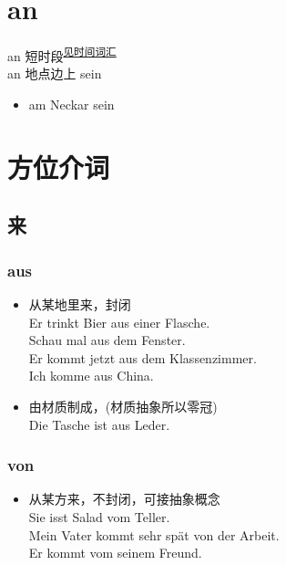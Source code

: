 \section{an}
an \olive[border=true] 短时段\textsuperscript{\hyperref[time:prep:an]{见时间词汇}} \\
an 地点边上 sein
\begin{itemize}
    \item am Neckar sein
\end{itemize}

\setlength{\parindent}{0pt}
\section{方位介词}


\subsection{来}

\subsubsection{aus \olive[border=true]}
\begin{itemize}
    \item 从某地里来，封闭 \\
          Er trinkt Bier aus einer Flasche.  \\
          Schau mal aus dem Fenster. \\
          Er kommt jetzt aus dem Klassenzimmer. \\
          Ich komme aus China. \\
    \item 由材质制成，(材质抽象所以零冠) \\
          Die Tasche ist aus Leder.
\end{itemize}

\subsubsection{von \olive[border=true]}
\begin{itemize}
    \item 从某方来，不封闭，可接抽象概念 \\
          Sie isst Salad vom Teller.  \\
          Mein Vater kommt sehr spät von der Arbeit. \\
          Er kommt vom seinem Freund. \\
\end{itemize}

